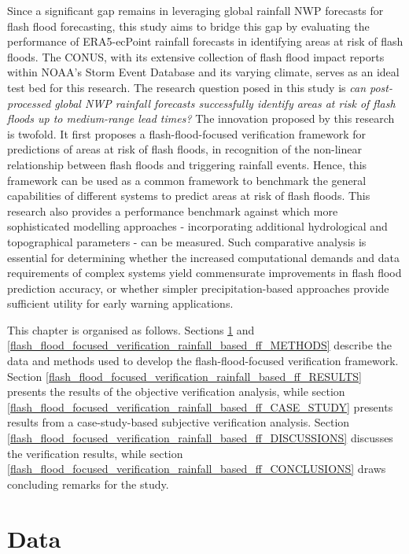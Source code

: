 Since a significant gap remains in leveraging global rainfall NWP forecasts for flash flood forecasting, this study aims to bridge this gap by evaluating the performance of ERA5-ecPoint rainfall forecasts in identifying areas at risk of flash floods. The CONUS, with its extensive collection of flash flood impact reports within NOAA's Storm Event Database and its varying climate, serves as an ideal test bed for this research. The research question posed in this study is \textit{can post-processed global NWP rainfall forecasts successfully identify areas at risk of flash floods up to medium-range lead times?} The innovation proposed by this research is twofold. It first proposes a flash-flood-focused verification framework for predictions of areas at risk of flash floods, in recognition of the non-linear relationship between flash floods and triggering rainfall events. Hence, this framework can be used as a common framework to benchmark the general capabilities of different systems to predict areas at risk of flash floods. This research also provides a performance benchmark against which more sophisticated modelling approaches - incorporating additional hydrological and topographical parameters - can be measured. Such comparative analysis is essential for determining whether the increased computational demands and data requirements of complex systems yield commensurate improvements in flash flood prediction accuracy, or whether simpler precipitation-based approaches provide sufficient utility for early warning applications.

This chapter is organised as follows. Sections \ref{flash_flood_focused_verification_rainfall_based_ff_DATA} and \ref{flash_flood_focused_verification_rainfall_based_ff_METHODS} describe the data and methods used to develop the flash-flood-focused verification framework. Section \ref{flash_flood_focused_verification_rainfall_based_ff_RESULTS} presents the results of the objective verification analysis, while section \ref{flash_flood_focused_verification_rainfall_based_ff_CASE_STUDY} presents results from a case-study-based subjective verification analysis. Section \ref{flash_flood_focused_verification_rainfall_based_ff_DISCUSSIONS} discusses the verification results, while section \ref{flash_flood_focused_verification_rainfall_based_ff_CONCLUSIONS} draws concluding remarks for the study.


\section{Data}
\label{flash_flood_focused_verification_rainfall_based_ff_DATA}


